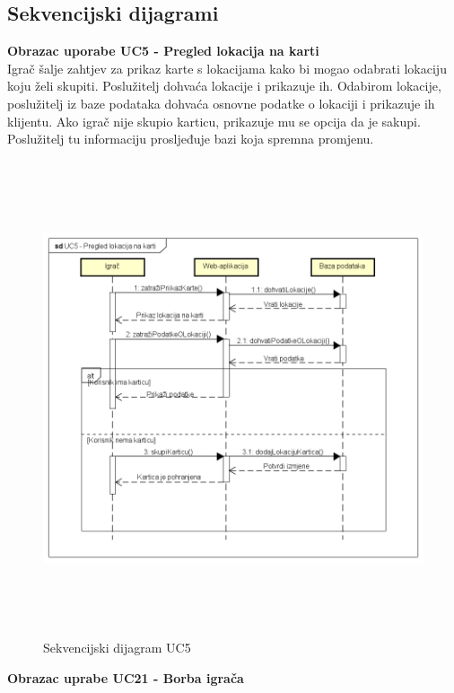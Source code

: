 					
				\eject		
				
			\subsection{Sekvencijski dijagrami}
			
				\textbf{Obrazac uporabe UC5 - Pregled lokacija na karti}\\
					
					{Igrač šalje zahtjev za prikaz karte s lokacijama kako bi mogao odabrati lokaciju koju želi skupiti. Poslužitelj dohvaća lokacije i prikazuje ih. Odabirom lokacije, poslužitelj iz baze podataka dohvaća osnovne podatke o lokaciji i prikazuje ih klijentu. Ako igrač nije skupio karticu, prikazuje mu se opcija da je sakupi. Poslužitelj tu informaciju prosljeđuje bazi koja spremna promjenu.}\\
					
					\begin{figure}[H]
						\includegraphics[width=\linewidth, height=14cm]{dijagrami/sd_UC5}
						\centering
						\caption{Sekvencijski dijagram UC5}
						\label{}
					\end{figure}
				\newpage	
				
				\textbf{Obrazac uprabe UC21 - Borba igrača}
					
